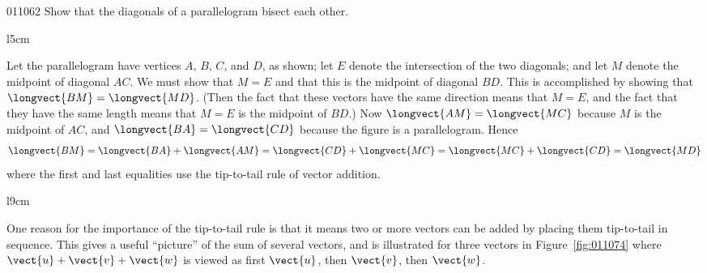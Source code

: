 \begin{example}{}{011062}
Show that the diagonals of a parallelogram bisect each other.

\begin{wrapfigure}{l}{5cm} 
\vspace*{-1em}
\centering

\end{wrapfigure}

\setlength{\rightskip}{0pt plus 200pt} 
\begin{solution}
  Let the parallelogram have vertices $A$, $B$, $C$, and $D$, as shown; let $E$ denote the intersection of the two diagonals; and let $M$ denote the midpoint of diagonal $AC$. We must show that $M = E$ and that this is the midpoint of diagonal $BD$. This is accomplished by showing that $\longvect{BM} = \longvect{MD}$. (Then the fact that these vectors have the same direction means that $M = E$, and the fact that they have the same length means that $M = E$ is the midpoint of $BD$.) Now $\longvect{AM} = \longvect{MC}$ because $M$ is the midpoint of $AC$, and $\longvect{BA} = \longvect{CD}$ because the figure is a parallelogram. Hence
\begin{equation*}
\longvect{BM} = \longvect{BA} + \longvect{AM} = \longvect{CD} + \longvect{MC} = \longvect{MC} + \longvect{CD} = \longvect{MD}
\end{equation*}
where the first and last equalities use the tip-to-tail rule of vector addition.
\end{solution}
\end{example}

\begin{wrapfigure}[7]{l}{9cm} 
\vspace*{-2em}
\centering

\caption{\label{fig:011074}}
\end{wrapfigure}
One  reason for the importance of the tip-to-tail rule is that it means two  or more vectors can be added by placing them tip-to-tail in sequence.  This gives a useful ``picture'' of the sum of several vectors, and is 
illustrated for three vectors in Figure~\ref{fig:011074} where $\vect{u} + \vect{v} + \vect{w}$ is viewed as first $\vect{u}$, then $\vect{v}$, then $\vect{w}$.

